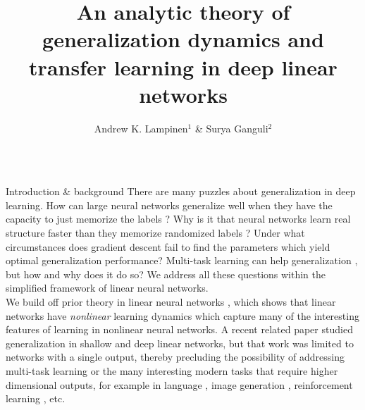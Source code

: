 \documentclass[final]{beamer}
\title{An analytic theory of generalization dynamics and transfer learning in deep linear networks}
\author{Andrew K. Lampinen$^1$ \& Surya Ganguli$^2$}
\institute{$^1$Department of Psychology, Stanford University, $^2$Department of Applied Physics, Stanford University}
\begin{document}

\begin{frame}[t]{}
\vspace{-1em}
\begin{columns}

\begin{column}[t]{0.248\textwidth}
\begin{block}{\large Introduction \& background}
\vspace{-0.5em}
There are many puzzles about generalization in deep learning. How can large neural networks generalize well when they have the capacity to just memorize the labels \citep{Zhang2016}? Why is it that neural networks learn real structure faster than they memorize randomized labels \citep{Arpit2017}? Under what circumstances does gradient descent fail to find the parameters which yield optimal generalization performance? Multi-task learning can help generalization \citep[e.g.]{Dong2015, Luong2016}, but how and why does it do so? We address all these questions within the simplified framework of linear neural networks.\\[0.5em] 
We build off prior theory in linear neural networks \citep{Saxe2013}, which shows that linear networks have \emph{nonlinear} learning dynamics which capture many of the interesting features of learning in nonlinear neural networks. A recent related paper \citep{Advani2017} studied generalization in shallow and deep linear networks, but that work was limited to networks with a single output, thereby precluding the possibility of addressing multi-task learning or the many interesting modern tasks that require higher dimensional outputs, for example in language \cite{Dong2015}, image generation \cite{Goodfellow2014}, reinforcement learning \cite{Mnih2015, Silver2016}, etc. 
\end{block}


\end{column}
\end{columns}
\end{frame}
\end{document}
